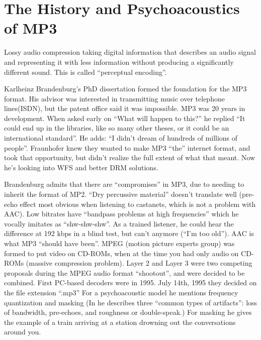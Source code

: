 \documentclass{thesis}
\begin{document}
\section{The History and Psychoacoustics of MP3}
Lossy audio compression taking digital information that describes an audio signal and representing it with less information without producing a significantly different sound. This is called ``perceptual encoding''.\cite{Ruckert05}

Karlheinz Brandenburg's PhD dissertation formed the foundation for the MP3 format. His advisor was interested in transmitting music over telephone lines(ISDN), but the patent office said it was impossible. MP3 was 20 years in development. When asked early on ``What will happen to this?'' he replied ``It could end up in the libraries, like so many other theses, or it could be an international standard''. He adds: ``I didn't dream of hundreds of millions of people''. Fraunhofer knew they wanted to make MP3 ``the'' internet format, and took that opportunity, but didn't realize the full extent of what that meant. Now he's looking into WFS and better DRM solutions.\cite{brandenburg_interviews_2004}
	
Brandenburg admits that there are ``compromises'' in MP3, due to needing to inherit the format of MP2. ``Dry percussive material'' doesn't translate well (pre-echo effect most obvious when listening to castanets, which is not a problem with AAC). Low bitrates have ``bandpass problems at high frequencies'' which he vocally imitates as ``shw-shw-shw''. As a trained listener, he could hear the difference at 192 kbps in a blind test, but can't anymore (``I'm too old''). AAC is what MP3 ``should have been''. MPEG (motion picture experts group) was formed to put video on CD-ROMs, when at the time you had only audio on CD-ROMs (massive compression problem). Layer 2 and Layer 3 were two competing proposals during the MPEG audio format ``shootout'', and were decided to be combined. First PC-based decoders were in 1995. July 14th, 1995 they decided on the file extension ``.mp3'' For a psychoacoustic model he mentions frequency quantization and masking (In \cite{karlheinz_brandenburg_mp3_1999} he describes three ``common types of artifacts'': loss of bandwidth, pre-echoes, and roughness or double-speak.) For masking he gives the example of a train arriving at a station drowning out the conversations around you.
\end{document}
